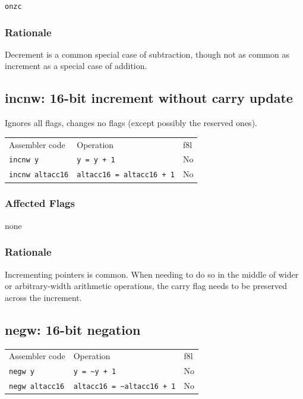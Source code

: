 \documentclass{book}
\begin{document}
\texttt{onzc}

\subsubsection*{Rationale}

Decrement is a common special case of subtraction, though not as common as increment as a special case of addition.


\subsection{incnw: 16-bit increment without carry update}

Ignores all flags, changes no flags (except possibly the reserved ones).

\begin{tabular}{l l l}
Assembler code          & Operation                        & f8l \\
\texttt{incnw y}        & \texttt{y = y + 1}               & No \\
\texttt{incnw altacc16} & \texttt{altacc16 = altacc16 + 1} & No \\
\end{tabular}

\subsubsection*{Affected Flags}

none

\subsubsection*{Rationale}

Incrementing pointers is common. When needing to do so in the middle of wider or arbitrary-width arithmetic operations, the carry flag needs to be preserved across the increment.


\subsection{negw: 16-bit negation}

\begin{tabular}{l l l}
Assembler code         & Operation                            & f8l \\
\texttt{negw y}        & \texttt{y = \~{}y + 1}               & No \\
\texttt{negw altacc16} & \texttt{altacc16 = \~{}altacc16 + 1} & No \\
\end{tabular}
\end{document}
